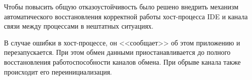 Чтобы повысить общую отказоустойчивость было решено внедрить механизм автоматического восстановления корректной работы хост-процесса IDE и канала связи между процессами в нештатных ситуациях.

В случае ошибки в хост-процессе, он <<сообщает>> об этом приложению и перезапускается. При этом обмен данными приостанавливается до полного восстановления работоспособности каналов обмена. При обрыве канала также происходит его переинициализация.

\pagebreak